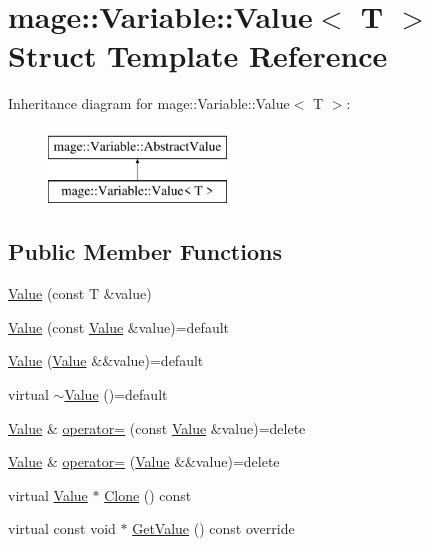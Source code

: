\hypertarget{structmage_1_1_variable_1_1_value}{}\section{mage\+:\+:Variable\+:\+:Value$<$ T $>$ Struct Template Reference}
\label{structmage_1_1_variable_1_1_value}
Inheritance diagram for mage\+:\+:Variable\+:\+:Value$<$ T $>$\+:\begin{figure}[H]
\begin{center}
\leavevmode
\includegraphics[height=2.000000cm]{structmage_1_1_variable_1_1_value}
\end{center}
\end{figure}
\subsection*{Public Member Functions}
\begin{DoxyCompactItemize}
\item 
\hyperlink{structmage_1_1_variable_1_1_value_a36aa54fe0b4e80228e7dbee545d9cb38}{Value} (const T \&value)
\item 
\hyperlink{structmage_1_1_variable_1_1_value_a962f7d07d601fd5d1a2c24f892607e16}{Value} (const \hyperlink{structmage_1_1_variable_1_1_value}{Value} \&value)=default
\item 
\hyperlink{structmage_1_1_variable_1_1_value_aeadb858e9a40f211c787cacc2fb2843b}{Value} (\hyperlink{structmage_1_1_variable_1_1_value}{Value} \&\&value)=default
\item 
virtual \hyperlink{structmage_1_1_variable_1_1_value_ab77eb80d4786a060778dc41ee73c1371}{$\sim$\+Value} ()=default
\item 
\hyperlink{structmage_1_1_variable_1_1_value}{Value} \& \hyperlink{structmage_1_1_variable_1_1_value_a19c45282edac9ffaa0f687b7dd414392}{operator=} (const \hyperlink{structmage_1_1_variable_1_1_value}{Value} \&value)=delete
\item 
\hyperlink{structmage_1_1_variable_1_1_value}{Value} \& \hyperlink{structmage_1_1_variable_1_1_value_a2185d5eeb8f321a7e4f6d97463af4987}{operator=} (\hyperlink{structmage_1_1_variable_1_1_value}{Value} \&\&value)=delete
\item 
virtual \hyperlink{structmage_1_1_variable_1_1_value}{Value} $\ast$ \hyperlink{structmage_1_1_variable_1_1_value_a4d59fec74fc5d25ecca86054ecc8d15d}{Clone} () const
\item 
virtual const void $\ast$ \hyperlink{structmage_1_1_variable_1_1_value_a04d70496ebb7ad71dafa3df877daeb26}{Get\+Value} () const override
\end{DoxyCompactItemize}
